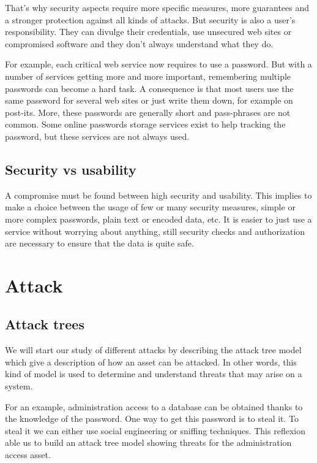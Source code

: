 That's why security aspects require more specific measures, more guarantees and
a stronger protection against all kinds of attacks. But security is also a user's
responsibility. They can divulge their credentials, use unsecured web sites or
compromised software and they don't always understand what they do.

For example, each critical web service now requires to use a password.
But with a number of services getting more and more important, remembering
multiple passwords can become a hard task. A consequence is that most users use
the same password for several web sites or just write them down, for example
on post-its. More, these passwords are generally short and pass-phrases are
not common.
Some online passwords storage services exist to help tracking the password, but
these services are not always used.

\subsection{Security vs usability}

A compromise must be found between high security and usability.
This implies to make a choice between the usage of few or many security
measures, simple or more complex passwords, plain text or encoded data, etc.
It is easier to just use a service without worrying about anything, still
security checks and authorization are necessary to ensure that the data is
quite safe.

\section{Attack}

\subsection{Attack trees}
We will start our study of different attacks by describing the attack tree model
which give a description of how an asset can be attacked. In other words, this
kind of model is used to determine and understand threats that may arise on a
system.

For an example, administration access to a database can be obtained
thanks to the knowledge of the password. One way to get this password is to
steal it. To steal it we can either use social engineering or sniffing
techniques. This reflexion able us to build an attack tree model showing threats
for the administration access asset.

